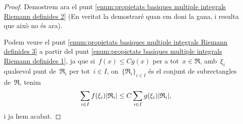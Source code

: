 \documentclass[../../main.tex]{subfiles}
\begin{document}
\begin{proposition}
\begin{proof}
            Demostrem ara el punt \eqref{enum:propietats basiques multiple integrals Riemann definides 2} (En veritat la demostraré quan em doni la gana, i resulta que això no és ara).

            Podem veure el punt \eqref{enum:propietats basiques multiple integrals Riemann definides 3} a partir del punt \eqref{enum:propietats basiques multiple integrals Riemann definides 1}, ja que si~\(f(x)\leq Cg(x)\) per a tot~\(x\in \mathfrak{R}\), amb~\(\xi_{i}\) qualsevol punt de~\(\mathfrak{R}_{i}\) per tot~\(i\in I\), on~\(\{\mathfrak{R}_{i}\}_{i\in I}\) és el conjunt de subrectangles de~\(\mathfrak{R}\), tenim
            \[
                \sum_{i\in I}f(\xi_{i})\abs{\mathfrak{R}_{i}}\leq C\sum_{i\in I}g(\xi_{i})\abs{\mathfrak{R}_{i}},
            \]
            i ja hem acabat.
        \end{proof}
    \end{proposition}
\end{document}
